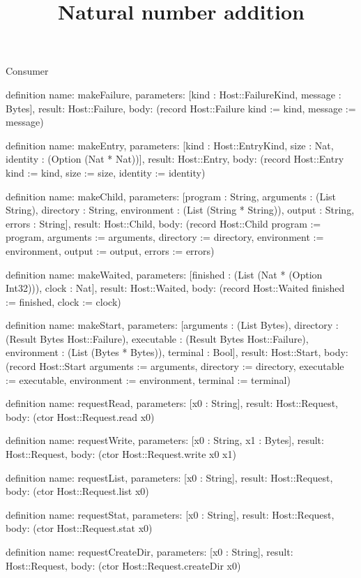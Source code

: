 \begin{lexlean}{Consumer}
\title{Natural number addition}
\begin{semanticmodule}
definition{
  name: makeFailure,
  parameters: [kind : Host::FailureKind, message : Bytes],
  result: Host::Failure,
  body: (record Host::Failure {kind := kind, message := message})
}

definition{
  name: makeEntry,
  parameters: [kind : Host::EntryKind, size : Nat, identity : (Option (Nat * Nat))],
  result: Host::Entry,
  body: (record Host::Entry {kind := kind, size := size, identity := identity})
}

definition{
  name: makeChild,
  parameters: [program : String, arguments : (List String), directory : String, environment : (List (String * String)), output : String, errors : String],
  result: Host::Child,
  body: (record Host::Child {program := program, arguments := arguments, directory := directory, environment := environment, output := output, errors := errors})
}

definition{
  name: makeWaited,
  parameters: [finished : (List (Nat * (Option Int32))), clock : Nat],
  result: Host::Waited,
  body: (record Host::Waited {finished := finished, clock := clock})
}

definition{
  name: makeStart,
  parameters: [arguments : (List Bytes), directory : (Result Bytes Host::Failure), executable : (Result Bytes Host::Failure), environment : (List (Bytes * Bytes)), terminal : Bool],
  result: Host::Start,
  body: (record Host::Start {arguments := arguments, directory := directory, executable := executable, environment := environment, terminal := terminal})
}

definition{
  name: requestRead,
  parameters: [x0 : String],
  result: Host::Request,
  body: (ctor Host::Request.read x0)
}

definition{
  name: requestWrite,
  parameters: [x0 : String, x1 : Bytes],
  result: Host::Request,
  body: (ctor Host::Request.write x0 x1)
}

definition{
  name: requestList,
  parameters: [x0 : String],
  result: Host::Request,
  body: (ctor Host::Request.list x0)
}

definition{
  name: requestStat,
  parameters: [x0 : String],
  result: Host::Request,
  body: (ctor Host::Request.stat x0)
}

definition{
  name: requestCreateDir,
  parameters: [x0 : String],
  result: Host::Request,
  body: (ctor Host::Request.createDir x0)
}


\end{semanticmodule}
\end{lexlean}
